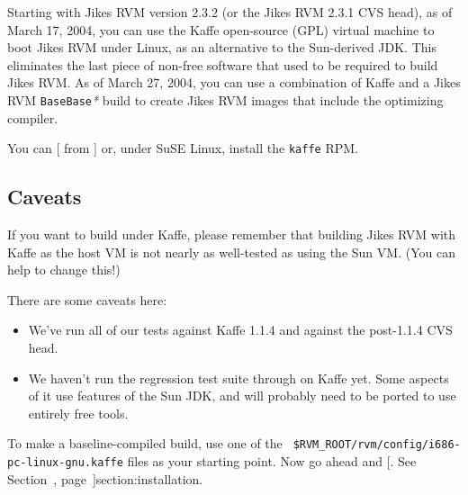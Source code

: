 \newcommand{\rvmbuild}[1]{\$RVM\_BUILD\texttt{/#1}}%
\newcommand{\gft}{\texttt{GenerateFromTemplate}}%
\newcommand{\gid}{\texttt{GenerateInterfaceDeclarations}}%
\newcommand{\biw}{\texttt{BootImageWriter}}%
%
%
Starting with Jikes RVM version 2.3.2 (or the Jikes RVM 2.3.1 CVS
head), as of March 17, 2004, you can use the Kaffe open-source (GPL)
virtual machine to boot Jikes RVM under Linux, as an alternative to
the Sun-derived JDK.  This eliminates the last piece of non-free
software that used to be required to build Jikes RVM.  As of
March 27, 2004, you can use a combination of Kaffe and a Jikes RVM
\texttt{BaseBase}\textit{*} build to create Jikes RVM images that
include the optimizing compiler.

You can [ from {\tt \KaffeURL}]{\KaffeURL} or,
under SuSE Linux, install the {\tt kaffe} RPM.  

\subsection{Caveats}

If you want to build under Kaffe, please remember that building Jikes
RVM with Kaffe as the host VM is not nearly as well-tested as using
the Sun VM.  (You can help to change this!)

There are some caveats here:

\begin{itemize}

\item We've run all of our tests against Kaffe 1.1.4 and against the
post-1.1.4 CVS head.



\item We haven't run the regression test suite through on Kaffe yet.
  Some aspects of it use features of the Sun JDK, and will probably
  need to be ported to use entirely free tools.

\end{itemize}

To make a baseline-compiled build, use one of the {\tt
\$RVM\_\-ROOT/rvm/config/i686-pc-linux-gnu.kaffe{\it *}} files as your
starting point.  Now go ahead and [.  See Section~\Ref,
page~\Pageref]{section:installation}.

